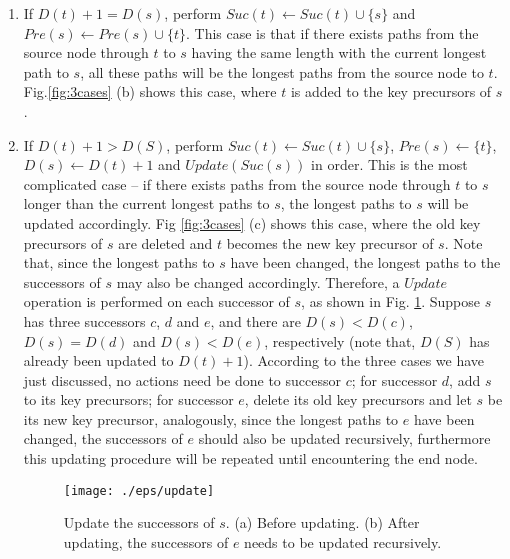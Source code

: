 \documentclass{article}
\begin{document}
\begin{enumerate}
\begin{enumerate}[i]
  \item If $D(t)+1 = D(s)$, perform
    $Suc(t) \leftarrow Suc(t) \cup \{s\}$ and
    $Pre(s) \leftarrow Pre(s) \cup \{t\}$. This case is that if there
    exists paths from the source node through $t$ to $s$ having the
    same length with the current longest path to $s$, all these paths
    will be the longest paths from the source node to
    $t$. Fig.\ref{fig:3cases} (b) shows this case, where $t$ is added
    to the key precursors of $s$.

  \item If $D(t)+1 > D(S)$, perform
    $Suc(t) \leftarrow Suc(t) \cup \{s\}$, $Pre(s) \leftarrow \{t\}$,
    $D(s) \leftarrow D(t) + 1$ and $Update(Suc(s))$ in order. This is
    the most complicated case -- if there exists paths from the source
    node through $t$ to $s$ longer than the current longest paths to
    $s$, the longest paths to $s$ will be updated accordingly. Fig
    \ref{fig:3cases} (c) shows this case, where the old key precursors
    of $s$ are deleted and $t$ becomes the new key precursor of
    $s$. Note that, since the longest paths to $s$ have been changed,
    the longest paths to the successors of $s$ may also be changed
    accordingly. Therefore, a $Update$ operation is performed on each
    successor of $s$, as shown in Fig. \ref{fig:update}.  Suppose $s$
    has three successors $c$, $d$ and $e$, and there are
    $D(s) < D(c)$, $D(s) = D(d)$ and $D(s) < D(e)$, respectively (note
    that, $D(S)$ has already been updated to $D(t)+1$). According to
    the three cases we have just discussed, no actions need be done to
    successor $c$; for successor $d$, add $s$ to its key precursors;
    for successor $e$, delete its old key precursors and let $s$ be
    its new key precursor, analogously, since the longest paths to $e$
    have been changed, the successors of $e$ should also be updated
    recursively, furthermore this updating procedure will be repeated
    until encountering the end node.

\begin{figure}[htbp]
  \centering
  \texttt{[image: ./eps/update]}
  \caption{Update the successors of $s$. (a) Before updating. (b)
    After updating, the successors of $e$ needs to be updated
    recursively.}
  \label{fig:update}
\end{figure}

\end{enumerate}
\end{enumerate}
\end{document}
